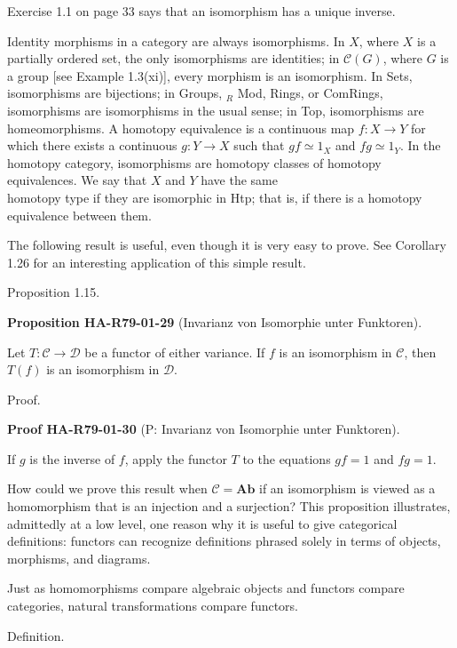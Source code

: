 \documentclass[10pt, letterpaper]{article}
\newcommand{\CustomHeading}[3]{%
  \par\medskip\noindent%
  \textbf{#1 #2} \textnormal{(#3)}.\enskip%
}
\newenvironment{PROP}[2]{\begin{unitbox}\CustomHeading{Proposition}{#1}{#2}}{\end{unitbox}}
\newenvironment{PROOF}[2]{\begin{unitbox}\CustomHeading{Proof}{#1}{#2}}{\end{unitbox}}
\begin{document}
Exercise 1.1 on page 33 says that an isomorphism has a unique inverse.



Identity morphisms in a category are always isomorphisms. In $X$, where $X$ is a partially ordered set, the only isomorphisms are identities; in $\mathcal{C}(G)$, where $G$ is a group [see Example 1.3(xi)], every morphism is an isomorphism. In Sets, isomorphisms are bijections; in Groups, ${ }_{R}$ Mod, Rings, or ComRings, isomorphisms are isomorphisms in the usual sense; in Top, isomorphisms are homeomorphisms. A homotopy equivalence is a continuous map $f: X \rightarrow Y$ for which there exists a continuous $g: Y \rightarrow X$ such that $g f \simeq 1_{X}$ and $f g \simeq 1_{Y}$. In the homotopy category, isomorphisms are homotopy classes of homotopy equivalences. We say that $X$ and $Y$ have the same\\
homotopy type if they are isomorphic in Htp; that is, if there is a homotopy equivalence between them.

The following result is useful, even though it is very easy to prove. See Corollary 1.26 for an interesting application of this simple result.

Proposition 1.15. 


\begin{PROP}{HA-R79-01-29}{Invarianz von Isomorphie unter Funktoren}
Let $T: \mathcal{C} \rightarrow \mathcal{D}$ be a functor of either variance. If $f$ is an isomorphism in $\mathcal{C}$, then $T(f)$ is an isomorphism in $\mathcal{D}$.
\end{PROP}


Proof. 

\begin{PROOF}{HA-R79-01-30}{P: Invarianz von Isomorphie unter Funktoren}
If $g$ is the inverse of $f$, apply the functor $T$ to the equations $g f=1$ and $f g=1$.
\end{PROOF}

How could we prove this result when $\mathcal{C}=\mathbf{A b}$ if an isomorphism is viewed as a homomorphism that is an injection and a surjection? This proposition illustrates, admittedly at a low level, one reason why it is useful to give categorical definitions: functors can recognize definitions phrased solely in terms of objects, morphisms, and diagrams.

Just as homomorphisms compare algebraic objects and functors compare categories, natural transformations compare functors.

Definition. 
\end{document}
